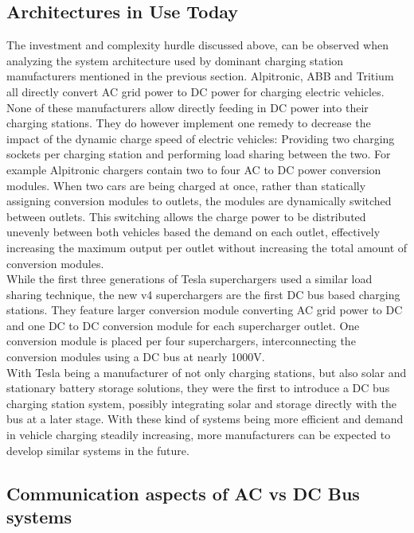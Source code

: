 \documentclass[conference,flushend]{iaria} %
\begin{document}
\subsection{Architectures in Use Today}
The investment and complexity hurdle discussed above, can be observed when analyzing the system architecture used by dominant charging station manufacturers mentioned in the previous section.
Alpitronic, ABB and Tritium all directly convert AC grid power to DC power for charging electric vehicles.
None of these manufacturers allow directly feeding in DC power into their charging stations.
They do however implement one remedy to decrease the impact of the dynamic charge speed of electric vehicles: Providing two charging sockets per charging station and performing load sharing between the two.
For example Alpitronic chargers contain two to four AC to DC power conversion modules.
When two cars are being charged at once, rather than statically assigning conversion modules to outlets, the modules are dynamically switched between outlets.
This switching allows the charge power to be distributed unevenly between both vehicles based the demand on each outlet, effectively increasing the maximum output per outlet without increasing the total amount of conversion modules. \\
While the first three generations of Tesla superchargers used a similar load sharing technique, the new v4 superchargers are the first DC bus based charging stations.
They feature larger conversion module converting AC grid power to DC and one DC to DC conversion module for each supercharger outlet.
One conversion module is placed per four superchargers, interconnecting the conversion modules using a DC bus at nearly 1000V. \\
With Tesla being a manufacturer of not only charging stations, but also solar and stationary battery storage solutions, they were the first to introduce a DC bus charging station system, possibly integrating solar and storage directly with the bus at a later stage.
With these kind of systems being more efficient and demand in vehicle charging steadily increasing, more manufacturers can be expected to develop similar systems in the future.

\subsection{Communication aspects of AC vs DC Bus systems}

\fi
\end{document}
